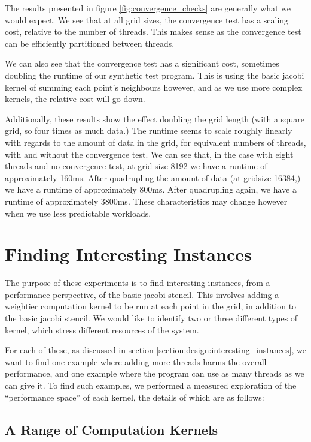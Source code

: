 The results presented in figure \ref{fig:convergence_checks} are generally what we would expect. We see that at all grid sizes, the convergence test has a scaling cost, relative to the number of threads. This makes sense as the convergence test can be efficiently partitioned between threads.

We can also see that the convergence test has a significant cost, sometimes doubling the runtime of our synthetic test program. This is using the basic jacobi kernel of summing each point's neighbours however, and as we use more complex kernels, the relative cost will go down.

Additionally, these results show the effect doubling the grid length (with a square grid, so four times as much data.) The runtime seems to scale roughly linearly with regards to the amount of data in the grid, for equivalent numbers of threads, with and without the convergence test. We can see that, in the case with eight threads and no convergence test, at grid size 8192 we have a runtime of approximately 160ms. After quadrupling the amount of data (at gridsize 16384,) we have a runtime of approximately 800ms. After quadrupling again, we have a runtime of approximately 3800ms. These characteristics may change however when we use less predictable workloads.



\section{Finding Interesting Instances}
\label{section:results:finding_interesting_instances}

The purpose of these experiments is to find interesting instances, from a performance perspective, of the basic jacobi stencil. This involves adding a weightier computation kernel to be run at each point in the grid, in addition to the basic jacobi stencil. We would like to identify two or three different types of kernel, which stress different resources of the system.

For each of these, as discussed in section \ref{section:design:interesting_instances}, we want to find one example where adding more threads harms the overall performance, and one example where the program can use as many threads as we can give it. To find such examples, we performed a measured exploration of the ``performance space'' of each kernel, the details of which are as follows:



\subsection{A Range of Computation Kernels}
\label{section:results:a_range_of_computation_kernels}

